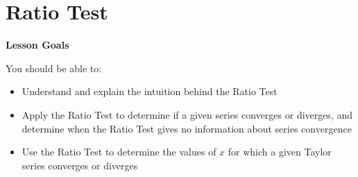 \documentclass[main]{subfiles}
\begin{document}
\ifSubfilesClassLoaded{%
  \chaptermark{\chaptertwo}
}{}

\section{Ratio Test} \label{ws2-10}
\begin{framed}
\centerline{\textbf{Lesson Goals}}

You should be able to:
\begin{itemize}
\item Understand and explain the intuition behind the Ratio Test
\item Apply the Ratio Test to determine if a given series converges or diverges, and determine when the Ratio Test gives no information about series convergence
\item Use the Ratio Test to determine the values of $x$ for which a given Taylor series converges or diverges
\end{itemize}
\end{framed}
\end{document}
